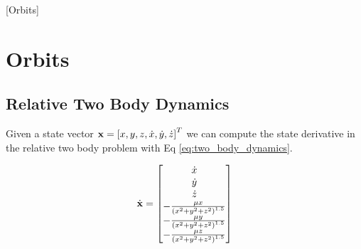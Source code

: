 [Orbits]

\chapter{Orbits}

\section{Relative Two Body Dynamics}

Given a state vector $\mathbf{x} = \left[ x, y, z, \dot{x}, \dot{y}, \dot{z} \right]^T$ we can compute the state derivative in the relative two body problem with Eq \ref{eq:two_body_dynamics}.

\begin{equation} \label{eq:two_body_dynamics}
    \dot{\mathbf{x}}
    =
    \left[\begin{matrix}
        \dot{x}\\
        \dot{y}\\
        \dot{z}\\
        -\frac{\mu x}{\left(x^2+y^2+z^2\right)^{1.5}}
        \\-\frac{\mu y}{\left(x^2+y^2+z^2\right)^{1.5}}
        \\-\frac{\mu z}{\left(x^2+y^2+z^2\right)^{1.5}}
        \\\end{matrix}\right]
\end{equation}